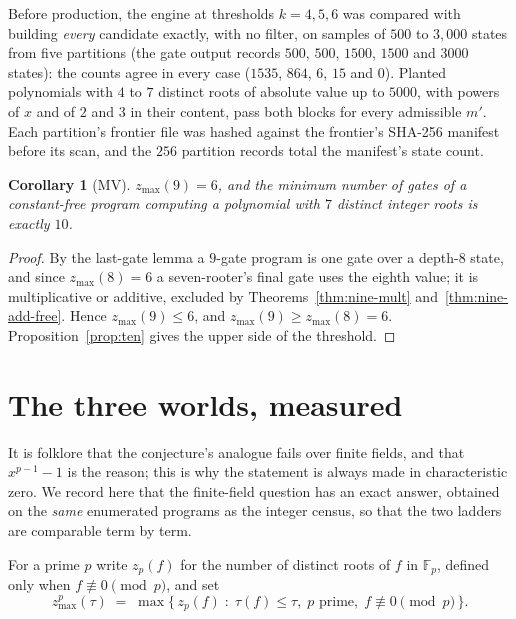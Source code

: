 \documentclass[11pt]{article}
\newtheorem{corollary}[theorem]{Corollary}
\theoremstyle{definition}
\theoremstyle{remark}
\newcommand{\zmax}{z_{\max}}
\newcommand{\zpmax}{z^{p}_{\max}}
\begin{document}
Before production, the engine at thresholds $k = 4, 5, 6$ was compared with
building \emph{every} candidate exactly, with no filter, on samples of $500$ to
$3{,}000$ states from five partitions (the gate output records $500$, $500$, $1500$, $1500$ and $3000$ states): the counts agree in every case ($1535$,
$864$, $6$, $15$ and $0$). Planted polynomials with $4$ to $7$ distinct roots of
absolute value up to $5000$, with powers of $x$ and of $2$ and $3$ in their
content, pass both blocks for every admissible $m'$. Each partition's frontier
file was hashed against the frontier's SHA-256 manifest before its scan, and the
$256$ partition records total the manifest's state count.

\begin{corollary}[MV]\label{cor:nine}
$\zmax(9) = 6$, and the minimum number of gates of a constant-free program
computing a polynomial with $7$ distinct integer roots is exactly $10$.
\end{corollary}
\begin{proof}
By the last-gate lemma a $9$-gate program is one gate over a depth-$8$ state, and
since $\zmax(8) = 6$ a seven-rooter's final gate uses the eighth value; it is
multiplicative or additive, excluded by Theorems~\ref{thm:nine-mult}
and~\ref{thm:nine-add-free}. Hence $\zmax(9) \le 6$, and $\zmax(9) \ge \zmax(8) = 6$.
Proposition~\ref{prop:ten} gives the upper side of the threshold.
\end{proof}

\section{The three worlds, measured}\label{sec:fp}

It is folklore that the conjecture's analogue fails over finite fields, and
that $x^{p-1}-1$ is the reason; this is why the statement is always made in
characteristic zero. We record here that the finite-field question has an
exact answer, obtained on the \emph{same} enumerated programs as the integer
census, so that the two ladders are comparable term by term.

For a prime $p$ write $z_p(f)$ for the number of distinct roots of $f$ in
$\mathbb{F}_p$, defined only when $f \not\equiv 0 \pmod p$, and set
\[
  \zpmax(\tau) \;=\; \max\bigl\{\, z_p(f) \;:\; \tau(f) \le \tau,\; p \text{ prime},\;
  f \not\equiv 0 \!\!\pmod p \,\bigr\}.
\]
\end{document}
